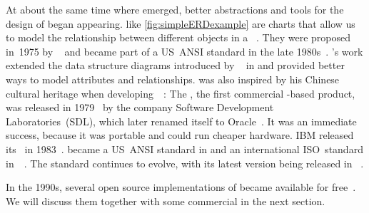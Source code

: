 At about the same time where  emerged, better abstractions and tools for the design of  began appearing.
 like \cref{fig:simpleERDexample} are charts that allow us to model the relationship between different objects in a \db~\cite{KW2012ASHOTEDAIM,C1976TERMTAUVOD}.
They were proposed in~1975 by \citeauthor{C1975TRMTAUVOD}~\cite{C1975TRMTAUVOD} and became part of a US~ANSI standard in the late 1980s~\cite{GK1985ATOOTIRDS,P1992IAX1ASFIRDSI}.
's work extended the data structure diagrams introduced by \citeauthor{B1969DSD}~\cite{B1969DSD} in \citeyear{B1969DSD} and provided better ways to model attributes and relationships.
 was also inspired by his Chinese cultural heritage when developing~~\cite{C1997ECAED,C2002ERMHEFTALL}:%
%
%
%
The \oracleDB, the first commercial -based product, was released in 1979~\cite{C20245YOQ} by the company Software Development Laboratories~(SDL), which later renamed itself to Oracle~\cite{O2007OTHTMIMIOHWCFTPWMIH}.
It was an immediate success, because it was portable and could run cheaper hardware.
IBM released its   \ in 1983~\cite{C20245YOQ,HS2013THAGOID,CWDS2007UDLVWE}.
 became a US~ANSI standard in \citeyear{ANSIX3135} and an international ISO~standard in~\citeyear{ISO90751987}~\cite{ANSIX3135,ISO90751987}.
The standard continues to evolve, with its latest version being released in \citeyear{ISOIEC9707112023E}~\cite{ISOIEC9707112023E}.

In the 1990s, several open source implementations of  became available for free~\cite{C20245YOQ}.
We will discuss them together with some commercial  in the next section.%
%
\endhsection%
%
